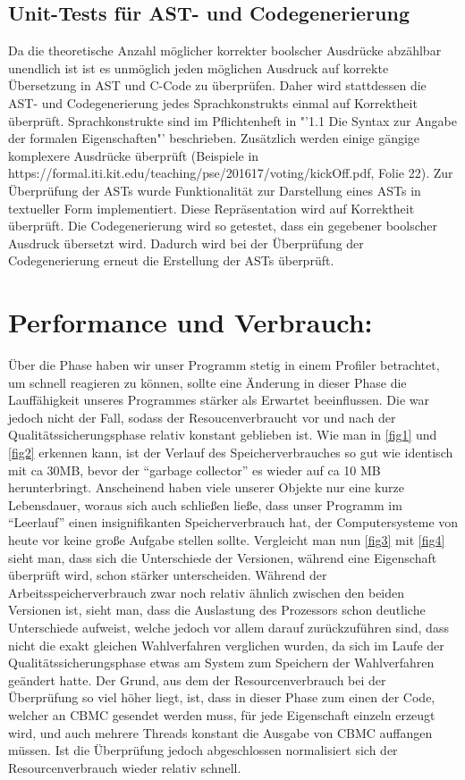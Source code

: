 ﻿\documentclass[a4paper]{scrreprt}
\begin{document}
\section{Unit-Tests für AST- und Codegenerierung}
Da die theoretische Anzahl möglicher korrekter boolscher Ausdrücke abzählbar unendlich ist ist es unmöglich jeden möglichen Ausdruck auf korrekte Übersetzung in AST und C-Code zu überprüfen. Daher wird stattdessen die AST- und Codegenerierung jedes Sprachkonstrukts einmal auf Korrektheit überprüft. Sprachkonstrukte sind im Pflichtenheft in "'1.1 Die Syntax zur Angabe der formalen Eigenschaften"' beschrieben. Zusätzlich werden einige gängige komplexere Ausdrücke überprüft (Beispiele in https://formal.iti.kit.edu/teaching/pse/201617/voting/kickOff.pdf, Folie 22). Zur Überprüfung der ASTs wurde Funktionalität zur Darstellung eines ASTs in textueller Form implementiert. Diese Repräsentation wird auf Korrektheit überprüft. Die Codegenerierung wird so getestet, dass ein gegebener boolscher Ausdruck übersetzt wird. Dadurch wird bei der Überprüfung der Codegenerierung erneut die Erstellung der ASTs überprüft. 

\chapter{Performance und Verbrauch:}
Über die Phase haben wir unser Programm stetig in einem Profiler betrachtet, um
schnell reagieren zu können, sollte eine Änderung in dieser Phase die
Lauffähigkeit unseres Programmes stärker als Erwartet beeinflussen.
\newline
Die war jedoch nicht der Fall, sodass der Resoucenverbraucht vor und nach der
Qualitätssicherungsphase relativ konstant geblieben ist.
\newline
Wie man in \ref{fig1} und \ref{fig2} erkennen kann, ist der Verlauf des
Speicherverbrauches so gut wie identisch mit ca 30MB, bevor der "`garbage
collector"' es wieder auf ca 10 MB herunterbringt. Anscheinend haben viele
unserer Objekte nur eine kurze Lebensdauer, woraus sich auch schließen ließe,
dass unser Programm im "`Leerlauf"' einen insignifikanten Speicherverbrauch hat,
der Computersysteme von heute vor keine große Aufgabe stellen sollte.
\newline
Vergleicht man nun \ref{fig3} mit \ref{fig4} sieht man, dass sich die
Unterschiede der Versionen, während eine Eigenschaft überprüft wird, schon
stärker unterscheiden. Während der Arbeitsspeicherverbrauch zwar noch relativ
ähnlich zwischen den beiden Versionen ist, sieht man, dass die Auslastung des
Prozessors schon deutliche Unterschiede aufweist, welche jedoch vor allem darauf
zurückzuführen sind, dass nicht die exakt gleichen Wahlverfahren verglichen
wurden, da sich im Laufe der Qualitätssicherungsphase etwas am System zum
Speichern der Wahlverfahren geändert hatte.
\newline
Der Grund, aus dem der Resourcenverbrauch bei der Überprüfung so viel höher
liegt, ist, dass in dieser Phase zum einen der Code, welcher an CBMC gesendet
werden muss, für jede Eigenschaft einzeln erzeugt wird, und auch mehrere Threads
konstant die Ausgabe von CBMC auffangen müssen.
Ist die Überprüfung jedoch abgeschlossen normalisiert sich der
Resourcenverbrauch wieder relativ schnell.
\end{document}
